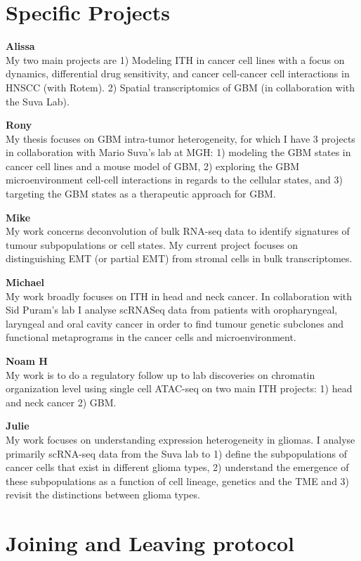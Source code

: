 \documentclass[]{book}
\begin{document}
\chapter{Specific Projects}\label{projects}

\textbf{Alissa}\\
My two main projects are 1) Modeling ITH in cancer cell lines with a
focus on dynamics, differential drug sensitivity, and cancer cell-cancer
cell interactions in HNSCC (with Rotem). 2) Spatial transcriptomics of
GBM (in collaboration with the Suva Lab).

\textbf{Rony}\\
My thesis focuses on GBM intra-tumor heterogeneity, for which I have 3
projects in collaboration with Mario Suva's lab at MGH: 1) modeling the
GBM states in cancer cell lines and a mouse model of GBM, 2) exploring
the GBM microenvironment cell-cell interactions in regards to the
cellular states, and 3) targeting the GBM states as a therapeutic
approach for GBM.

\textbf{Mike}\\
My work concerns deconvolution of bulk RNA-seq data to identify
signatures of tumour subpopulations or cell states. My current project
focuses on distinguishing EMT (or partial EMT) from stromal cells in
bulk transcriptomes.

\textbf{Michael}\\
My work broadly focuses on ITH in head and neck cancer. In collaboration
with Sid Puram's lab I analyse scRNASeq data from patients with
oropharyngeal, laryngeal and oral cavity cancer in order to find tumour
genetic subclones and functional metaprograms in the cancer cells and
microenvironment.

\textbf{Noam H}\\
My work is to do a regulatory follow up to lab discoveries on chromatin
organization level using single cell ATAC-seq on two main ITH projects:
1) head and neck cancer 2) GBM.

\textbf{Julie}\\
My work focuses on understanding expression heterogeneity in gliomas. I
analyse primarily scRNA-seq data from the Suva lab to 1) define the
subpopulations of cancer cells that exist in different glioma types, 2)
understand the emergence of these subpopulations as a function of cell
lineage, genetics and the TME and 3) revisit the distinctions between
glioma types.

\chapter{Joining and Leaving protocol}\label{joiningLeaving}
\end{document}

